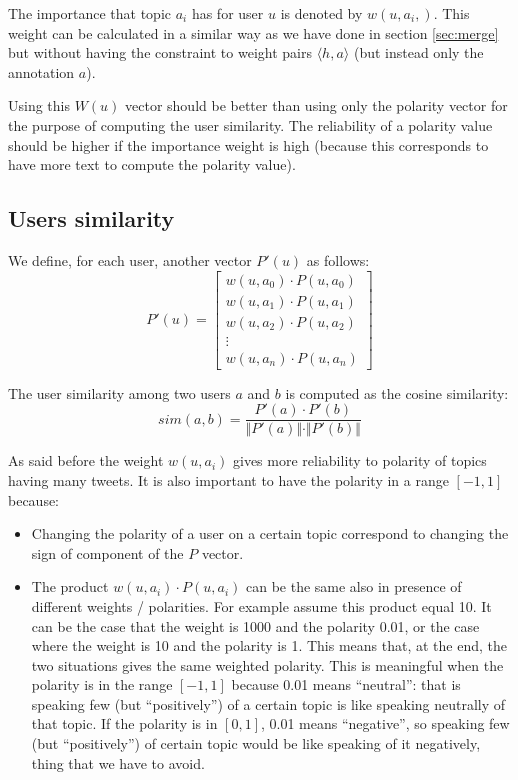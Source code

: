 \documentclass[a4paper,11pt,oneside]{article}
\begin{document}
The importance that topic $a_i$ has for user $u$ is denoted by $w(u,a_i,)$. This weight can be calculated in a similar way as we have done in section \ref{sec:merge} but without having the constraint to weight pairs $\langle h,a \rangle$ (but instead only the annotation $a$).

Using this $W(u)$ vector should be better than using only the polarity vector for the purpose of computing the user similarity. The reliability of a polarity value should be higher if the importance weight is high (because this corresponds to have more text to compute the polarity value).

\subsection{Users similarity}
We define, for each user, another vector $P'(u)$ as follows:
\begin{equation}
P'(u) = \left[  \begin{array}{c}
w(u,a_0) \cdot P(u,a_0) \\ 
w(u,a_1)  \cdot P(u,a_1) \\ 
w(u,a_2)  \cdot P(u,a_2) \\ 
\vdots \\ 
w(u,a_n) \cdot P(u,a_n)
\end{array}\right]
\end{equation}

The user similarity among two users $a$ and $b$ is computed as the cosine similarity:
\begin{equation}
sim(a,b) = \frac{P'(a) \cdot P'(b)}{\Vert P'(a)\Vert \cdot \Vert P'(b) \Vert} 
\end{equation}

As said before the weight $w(u,a_i)$ gives more reliability to polarity of topics having many tweets. It is also important to have the polarity in a range $[-1,1]$ because:

\begin{itemize}
\item Changing the polarity of a user on a certain topic correspond to changing the sign of component of the $P$ vector.
\item The product $w(u,a_i) \cdot P(u,a_i)$ can be the same also in presence of different weights / polarities. For example assume this product equal 10. It can be the case that the weight is 1000 and the polarity 0.01, or the case where the weight is 10 and the polarity is 1.
This means that, at the end, the two situations gives the same weighted polarity. This is meaningful when the polarity is in the range $[-1,1]$ because 0.01 means ``neutral'': that is speaking few (but ``positively'') of a certain topic is like speaking neutrally of that topic.
If the polarity is in $[0,1]$, 0.01 means ``negative'', so speaking few (but ``positively'') of certain topic would be like speaking of it negatively, thing that we have to avoid.
\end{itemize}



\end{document}
